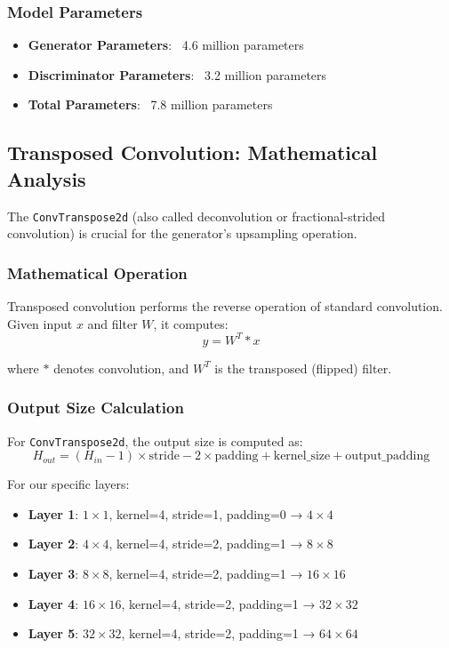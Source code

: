 \documentclass[conference,12pt]{IEEEtran}
\begin{document}
\subsubsection{Model Parameters}

\begin{itemize}
    \item \textbf{Generator Parameters}: ~4.6 million parameters
    \item \textbf{Discriminator Parameters}: ~3.2 million parameters
    \item \textbf{Total Parameters}: ~7.8 million parameters
\end{itemize}

\subsection{Transposed Convolution: Mathematical Analysis}

The \texttt{ConvTranspose2d} (also called deconvolution or fractional-strided convolution) is crucial for the generator's upsampling operation.

\subsubsection{Mathematical Operation}

Transposed convolution performs the reverse operation of standard convolution. Given input $x$ and filter $W$, it computes:
\begin{equation}
    y = W^T * x
\end{equation}

where $*$ denotes convolution, and $W^T$ is the transposed (flipped) filter.

\subsubsection{Output Size Calculation}

For \texttt{ConvTranspose2d}, the output size is computed as:
\begin{equation}
    H_{out} = (H_{in} - 1) \times \text{stride} - 2 \times \text{padding} + \text{kernel\_size} + \text{output\_padding}
\end{equation}

For our specific layers:
\begin{itemize}
    \item \textbf{Layer 1}: $1 \times 1$, kernel=4, stride=1, padding=0 → $4 \times 4$
    \item \textbf{Layer 2}: $4 \times 4$, kernel=4, stride=2, padding=1 → $8 \times 8$
    \item \textbf{Layer 3}: $8 \times 8$, kernel=4, stride=2, padding=1 → $16 \times 16$
    \item \textbf{Layer 4}: $16 \times 16$, kernel=4, stride=2, padding=1 → $32 \times 32$
    \item \textbf{Layer 5}: $32 \times 32$, kernel=4, stride=2, padding=1 → $64 \times 64$
\end{itemize}
\end{document}
